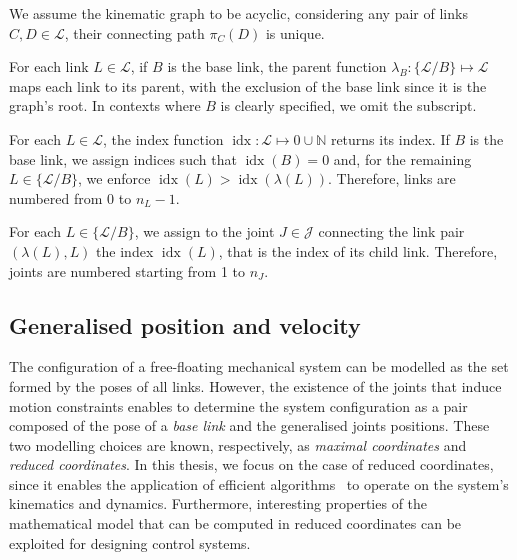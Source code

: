 \begin{assumption*}
%
We assume the kinematic graph to be acyclic, \ie considering any pair of links $C, D \in \mathcal{L}$, their connecting path $\pi_C(D)$ is unique.
%
\end{assumption*}

\begin{definition*}
%
For each link $L \in \mathcal{L}$, if $B$ is the base link, the parent function $\lambda_B: \{\mathcal{L} / B\} \mapsto \mathcal{L}$ maps each link to its parent, with the exclusion of the base link since it is the graph's root.
In contexts where $B$ is clearly specified, we omit the subscript.
%
\end{definition*}

\begin{definition*}
%
For each $L \in \mathcal{L}$, the index function $\operatorname{idx}: \mathcal{L} \mapsto 0 \cup \mathbb{N}$ returns its index.
If $B$ is the base link, we assign indices such that $\operatorname{idx}(B) = 0$ and, for the remaining $L \in \{\mathcal{L} / B\}$, we enforce $\operatorname{idx}(L) > \operatorname{idx}(\lambda(L))$.
Therefore, links are numbered from $0$ to $n_L - 1$.
%
\end{definition*}

\begin{definition*}
%
For each $L \in \{\mathcal{L} / B\}$, we assign to the joint $J \in \mathcal{J}$ connecting the link pair $(\lambda(L), L)$ the index $\operatorname{idx}(L)$, that is the index of its child link.
Therefore, joints are numbered starting from 1 to $n_J$.
%
\end{definition*}

\subsection{Generalised position and velocity}

The configuration of a free-floating mechanical system can be modelled as the set formed by the poses of all links.
However, the existence of the joints that induce motion constraints enables to determine the system configuration as a pair composed of the pose of a \emph{base link} and the generalised joints positions.
These two modelling choices are known, respectively, as \emph{maximal coordinates} and \emph{reduced coordinates}.
In this thesis, we focus on the case of	reduced coordinates, since it enables the application of efficient algorithms~\parencite{featherstone_rigid_2008} to operate on the system's kinematics and dynamics.
Furthermore, interesting properties of the mathematical model that can be computed in reduced coordinates can be exploited for designing control systems.

